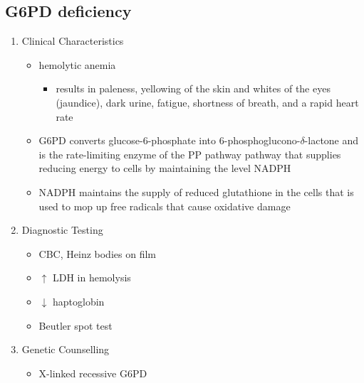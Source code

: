 \documentclass[12pt]{scrartcl}
\begin{document}
\subsection{G6PD deficiency}
\label{sec:org5f55438}
\begin{enumerate}
\item Clinical Characteristics
\label{sec:orgd5be7a7}
\begin{itemize}
\item hemolytic anemia
\begin{itemize}
\item results in paleness, yellowing of the skin and whites of the
eyes (jaundice), dark urine, fatigue, shortness of breath, and a
rapid heart rate
\end{itemize}
\item G6PD converts glucose-6-phosphate into
6-phosphoglucono-\(\delta\)-lactone and is the rate-limiting enzyme of
the PP pathway pathway that supplies reducing energy to cells by
maintaining the level NADPH
\item NADPH maintains the supply of reduced glutathione in the cells that
is used to mop up free radicals that cause oxidative damage
\end{itemize}
\item Diagnostic Testing
\label{sec:org27bc445}
\begin{itemize}
\item CBC, Heinz bodies on film
\item \(\uparrow\) LDH in hemolysis
\item \(\downarrow\) haptoglobin
\item Beutler spot test
\end{itemize}
\item Genetic Counselling
\label{sec:orgb7607db}
\begin{itemize}
\item X-linked recessive G6PD
\end{itemize}
\end{enumerate}
\end{document}
